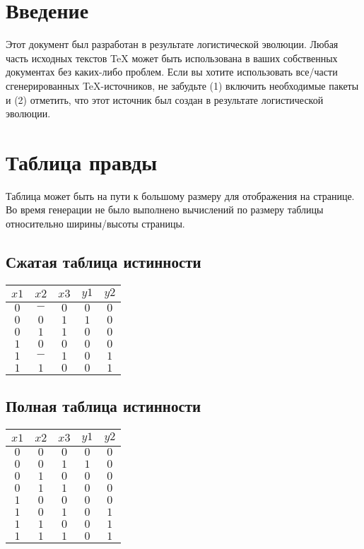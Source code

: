 \documentclass [15pt,a4paper,twoside]{article}
\begin{document}
\section{Введение}
Этот документ был разработан в результате логистической эволюции. Любая часть исходных текстов TeX может быть использована в ваших собственных документах без каких-либо проблем. Если вы хотите использовать все/части сгенерированных TeX-источников, не забудьте (1) включить необходимые пакеты и (2) отметить, что этот источник был создан в результате логистической эволюции.
\section{Таблица правды}
Таблица может быть на пути к большому размеру для отображения на странице. Во время генерации не было выполнено вычислений по размеру таблицы относительно ширины/высоты страницы.
\subsection{Сжатая таблица истинности}
\begin{center}
\begin{tabular}{ccc|cc}
$x1$&$x2$&$x3$&$y1$&$y2$\\
\hline
$0$&$-$&$0$&$0$&$0$\\
$0$&$0$&$1$&$1$&$0$\\
$0$&$1$&$1$&$0$&$0$\\
$1$&$0$&$0$&$0$&$0$\\
$1$&$-$&$1$&$0$&$1$\\
$1$&$1$&$0$&$0$&$1$\\

\end{tabular}
\end{center}
\subsection{Полная таблица истинности}
\begin{center}
\begin{tabular}{ccc|cc}
$x1$&$x2$&$x3$&$y1$&$y2$\\
\hline
$0$&$0$&$0$&$0$&$0$\\
$0$&$0$&$1$&$1$&$0$\\
$0$&$1$&$0$&$0$&$0$\\
$0$&$1$&$1$&$0$&$0$\\
$1$&$0$&$0$&$0$&$0$\\
$1$&$0$&$1$&$0$&$1$\\
$1$&$1$&$0$&$0$&$1$\\
$1$&$1$&$1$&$0$&$1$\\

\end{tabular}
\end{center}
\end{document}
